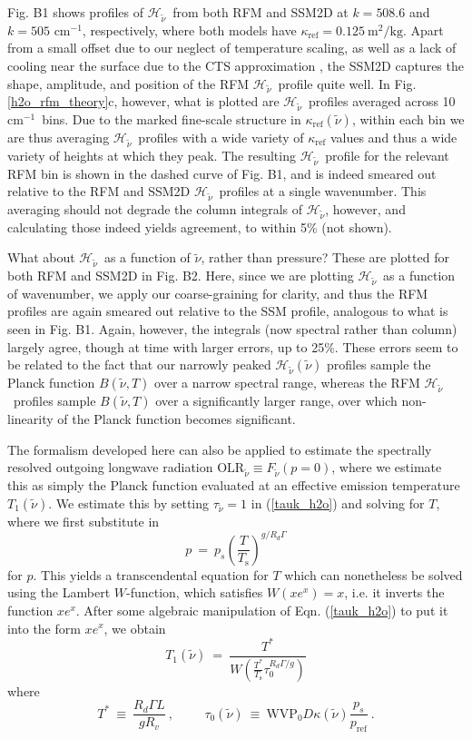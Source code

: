 \documentclass{ametsoc}
\newcommand{\beqn}{\begin{equation}}
\newcommand{\eeqn}{\end{equation}}
\newcommand{\beqnonum}{\begin{equation*}}
\newcommand{\eeqnonum}{\end{equation*}}
\newcommand{\n}{\nonumber}
\newcommand{\eqnref}[1]{(\ref{#1})}
\newcommand{\kg}{\ensuremath{\mathrm{kg}}}
\newcommand{\meter}{\ensuremath{\mathrm{m}}}
\newcommand{\cminverse}{\ensuremath{\mathrm{cm^{-1}}}}
\newcommand{\Rd}{\ensuremath{R_d}}
\newcommand{\Rv}{\ensuremath{R_v}}
\newcommand{\Ts}{\ensuremath{T_\mathrm{s}}}
\newcommand{\ps}{\ensuremath{p_s}}
\newcommand{\wv}{\ensuremath{\widetilde{\nu}}}
\newcommand{\OLRk}{\ensuremath{\mathrm{OLR}_{\wv}}}
\newcommand{\ch}{\ensuremath{\mathcal{H}}}
\newcommand{\chk}{\ensuremath{\ch_{\wv}}}
\newcommand{\tauk}{\ensuremath{\tau_{\wv}}}
\newcommand{\kapparef}{\ensuremath{\kappa_{\mathrm{ref}}}}
\newcommand{\pref}{\ensuremath{p_{\mathrm{ref}}}}
\newcommand{\WVP}{\ensuremath{\mathrm{WVP}}}
\newcommand{\Tstar}{\ensuremath{T^*}}
\newcommand{\Tone}{\ensuremath{T_1}}
\begin{document}
Fig. B1 shows profiles of \chk\ from both RFM and SSM2D at $k=508.6$ and $k=505$ \cminverse, respectively, where both models have $\kapparef = 0.125 \ \meter^2/\kg$. Apart from a small offset due to our neglect of temperature scaling, as well as a lack of cooling near the surface due to the CTS approximation \citep{jeevanjee2019b}, the SSM2D captures the shape, amplitude, and position of the RFM \chk\ profile quite well. In Fig. \ref{h2o_rfm_theory}c, however, what is plotted are \chk\ profiles averaged across 10 \cminverse\ bins. Due to the marked fine-scale structure in $\kapparef(\wv)$, within each bin we are thus averaging \chk\ profiles with a wide variety of $\kapparef$ values and thus a wide variety of heights at which they peak. The resulting \chk\ profile for the relevant RFM bin is shown in the dashed curve of Fig. B1, and is indeed smeared out relative to the RFM and SSM2D \chk\ profiles at a single wavenumber. This averaging should not degrade the column integrals of \chk, however, and calculating those indeed yields agreement, to within 5\% (not shown). 

What about \chk\ as a function of \wv, rather than pressure? These are plotted for both RFM and SSM2D in Fig. B2. Here, since we are plotting \chk\ as a function of wavenumber, we apply our coarse-graining  for clarity, and thus the RFM profiles are again smeared out relative to the SSM profile, analogous to what is seen in Fig. B1. Again, however, the integrals (now spectral rather than column) largely agree, though at time with larger errors, up to 25\%. These errors seem to be related to the fact that our narrowly peaked $\chk(\wv)$ profiles sample the Planck function $B(\wv,T)$ over a narrow spectral range, whereas the RFM \chk\ profiles sample $B(\wv,T)$ over a significantly larger range, over which non-linearity of the Planck function becomes significant.



\appendix[C] \label{appendix_OLR}
The formalism developed here can also be applied to estimate the spectrally resolved outgoing longwave radiation $\OLRk \equiv F_{\wv}(p=0)$, where we estimate this as simply the Planck function evaluated at an effective emission temperature $\Tone(\wv)$. We estimate this by  setting $\tauk=1$ in  \eqnref{tauk_h2o} and solving for $T$, where we first substitute in
\beqn
	p \ =\ \ps\left(\frac{T}{\Ts}\right)^{g/\Rd\Gamma}  
	\n
\eeqn
for $p$. This yields a transcendental equation for $T$ which can nonetheless be solved using the Lambert $W$-function, which satisfies $W(xe^x) = x$, i.e. it inverts the function $xe^x$. After some algebraic manipulation of Eqn. \eqnref{tauk_h2o} to put it into the form $xe^x$, we obtain
\beqn
	\Tone(\wv)  \ = \ 	\frac{\Tstar}{W(\frac{\Tstar}{\Ts}\tau_0^{\Rd\Gamma/g})}
	\n
\eeqn
where 
\beqnonum
	\Tstar 	  \ \equiv \ \frac{\Rd \Gamma L}{g \Rv} \ , \hspace{1cm}  \tau_0(\wv)  \ \equiv \   \WVP_0 D \kappa(\wv)\frac{\ps}{\pref}  \ .
\eeqnonum
\end{document}
